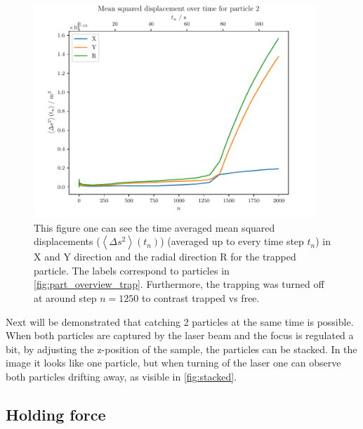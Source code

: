 \documentclass[12pt,english,ngerman]{scrartcl}
\begin{document}
\begin{figure}[H]
	\centering
	\includegraphics[width=0.95\textwidth]{figures/III_particle_trapped.pdf}
	\caption[Time averaged mean squared displacements of trapped particle]{This figure one
		can see the time averaged mean squared displacements ($\left\langle \Delta s^2
			\right\rangle(t_n)$) (averaged up to every time step $t_n$) in X and Y
		direction and the radial direction R for the trapped particle. The labels
		correspond to particles in \autoref{fig:part_overview_trap}. Furthermore, the
		trapping was turned off at around step $n=1250$ to contrast trapped vs free.
	}\label{fig:part_trapped}
\end{figure}

Next will be demonstrated that catching 2 particles at the same time is
possible. When both particles are captured by the laser beam and the focus is
regulated a bit, by adjusting the z-position of the sample, the particles can
be stacked. In the image it looks like one particle, but when turning of the
laser one can observe both particles drifting away, as visible in
\autoref{fig:stacked}.


\subsection{Holding force}
\end{document}
